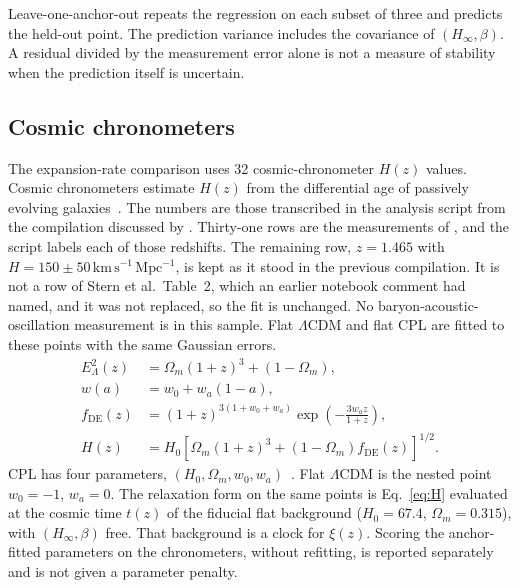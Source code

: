 Leave-one-anchor-out repeats the regression on each subset of three and predicts the held-out point.
The prediction variance includes the covariance of $(H_{\infty},\beta)$.
A residual divided by the measurement error alone is not a measure of stability when the prediction itself is uncertain.

\subsection{Cosmic chronometers}
\label{sec:cc-data}

The expansion-rate comparison uses 32 cosmic-chronometer $H(z)$ values.
Cosmic chronometers estimate $H(z)$ from the differential age of passively evolving galaxies~\citep{JimenezLoeb2002}.
The numbers are those transcribed in the analysis script from the compilation discussed by \citep{Moresco2022}.
Thirty-one rows are the measurements of \citep{Jimenez2003,Simon2005,Stern2010,Moresco2012,Zhang2014,Moresco2015,Moresco2016,Borghi2022}, and the script labels each of those redshifts.
The remaining row, $z=1.465$ with $H=150\pm50\,\mathrm{km\,s^{-1}\,Mpc^{-1}}$, is kept as it stood in the previous compilation.
It is not a row of Stern et al.\ Table~2, which an earlier notebook comment had named, and it was not replaced, so the fit is unchanged.
No baryon-acoustic-oscillation measurement is in this sample.
Flat $\Lambda$CDM and flat CPL are fitted to these points with the same Gaussian errors.
\begin{align}
  E_{\Lambda}^{2}(z)&=\Omega_{m}(1+z)^{3}+(1-\Omega_{m}),
  \label{eq:lcdm}\\
  w(a)&=w_{0}+w_{a}(1-a),
  \label{eq:cplw}\\
  f_{\mathrm{DE}}(z)&=(1+z)^{3(1+w_{0}+w_{a})}\exp\!\left(-\frac{3w_{a}z}{1+z}\right),
  \label{eq:fde}\\
  H(z)&=H_{0}\left[\Omega_{m}(1+z)^{3}+(1-\Omega_{m})f_{\mathrm{DE}}(z)\right]^{1/2}.
  \label{eq:cpl}
\end{align}
CPL has four parameters, $(H_{0},\Omega_{m},w_{0},w_{a})$~\citep{Chevallier2001,Linder2003}.
Flat $\Lambda$CDM is the nested point $w_{0}=-1$, $w_{a}=0$.
The relaxation form on the same points is Eq.~\eqref{eq:H} evaluated at the cosmic time $t(z)$ of the fiducial flat background ($H_{0}=67.4$, $\Omega_{m}=0.315$), with $(H_{\infty},\beta)$ free.
That background is a clock for $\xi(z)$.
Scoring the anchor-fitted parameters on the chronometers, without refitting, is reported separately and is not given a parameter penalty.

